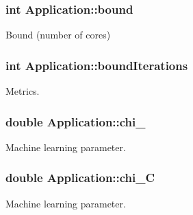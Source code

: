 \hypertarget{classApplication_a6e91bef9d503af0e8ba38c8f445c8cb0}{
\subsubsection[{bound}]{\setlength{\rightskip}{0pt plus 5cm}int Application\-::bound}}\label{classApplication_a6e91bef9d503af0e8ba38c8f445c8cb0}


Bound (number of cores) 

\hypertarget{classApplication_a6a3692743eccba602a58fdfc3f23950b}{
\subsubsection[{bound\-Iterations}]{\setlength{\rightskip}{0pt plus 5cm}int Application\-::bound\-Iterations}}\label{classApplication_a6a3692743eccba602a58fdfc3f23950b}


Metrics. 

\hypertarget{classApplication_a3b9dab40d189989c836b8d328946bbb6}{
\subsubsection[{chi\-\_\-0}]{\setlength{\rightskip}{0pt plus 5cm}double Application\-::chi\-\_}}\label{classApplication_a3b9dab40d189989c836b8d328946bbb6}


Machine learning parameter. 

\hypertarget{classApplication_a46e29a6bfc74de610feec809a77dfb62}{
\subsubsection[{chi\-\_\-\-C}]{\setlength{\rightskip}{0pt plus 5cm}double Application\-::chi\-\_\-\-C}}\label{classApplication_a46e29a6bfc74de610feec809a77dfb62}


Machine learning parameter. 

